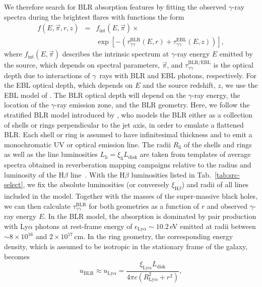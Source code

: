 \documentclass[twocolumn]{aastex62}
\newcommand{\Grays}{$\gamma$~rays\xspace}
\newcommand{\gray}{$\gamma$-ray\xspace}
\begin{document}
We therefore search for BLR absorption features by fitting the observed \gray spectra during the brightest flares with functions the form 
\begin{eqnarray}
    f(E,\vec{\pi},r,z) &=& f_\mathrm{int}(E,\vec{\pi}) \times \nonumber \\ &{}& \exp\left[-\left(\tau_{\gamma\gamma}^\mathrm{BLR}(E,r) +\tau_{\gamma\gamma}^\mathrm{EBL}(E,z) \right)  \right],
\end{eqnarray} 
where $f_\mathrm{int}(E, \vec{\pi})$ describes the intrinsic spectrum at \gray energy $E$ emitted by the source, which depends on spectral parameters, $\vec{\pi}$, and $\tau_{\gamma\gamma}^\mathrm{BLR / EBL}$ is the optical depth due to interactions of \Grays with BLR and EBL photons, respectively. 
For the EBL optical depth, which depends on $E$ and the source redshift, $z$, we use the EBL model of \citet{2011MNRAS.410.2556D}.
The BLR optical depth will depend on the \gray energy, the location of the \gray emission zone, and the BLR geometry. 
Here, we follow the stratified BLR model introduced by \citet{finke2016}, who models the BLR either as a collection of shells or rings perpendicular to the jet axis, in order to emulate a flattened BLR. 
Each shell or ring is assumed to have infinitesimal thickness and to emit a monochromatic UV or optical emission line. 
The radii $R_\mathrm{li}$ of the shells and rings as well as the line luminosities $L_\mathrm{li} = \xi_\mathrm{li}L_\mathrm{disk}$ are taken from templates of average spectra obtained in reverberation mapping campaigns relative to the radius and luminosity of the H$\beta$ line~\citep[see][for further details]{finke2016}.
With the H$\beta$ luminosities listed in Tab.~\ref{tab:src-select}, we fix the absolute luminosities (or conversely $\xi_{\mathrm{H}\beta}$) and radii of all lines included in the model.  
Together with the masses of the super-massive black holes, we can then calculate $\tau_{\gamma\gamma}^\mathrm{BLR}$ for both geometries as a function of $r$ and observed \gray energy $E$.
In the BLR model, the absorption is dominated by pair production with Ly$\alpha$ photons at rest-frame energy of $\epsilon_{\mathrm{Ly}\alpha}\sim10.2\,$eV emitted at radii between $\sim 8\times10^{16}$ and $2\times10^{17}$\,cm. 
In the ring geometry, the corresponding energy density, which is assumed to be isotropic in the stationary frame of the galaxy, becomes~\citep{finke2016}
    \begin{equation}
        u_\mathrm{BLR} \approx u_{\mathrm{Ly}\alpha}= \frac{\xi_{\mathrm{Ly}\alpha}L_\mathrm{disk}}{4\pi c(R_{\mathrm{Ly}\alpha}^2 + r^2)},
        \label{eq:u-blr}
    \end{equation}
\end{document}
